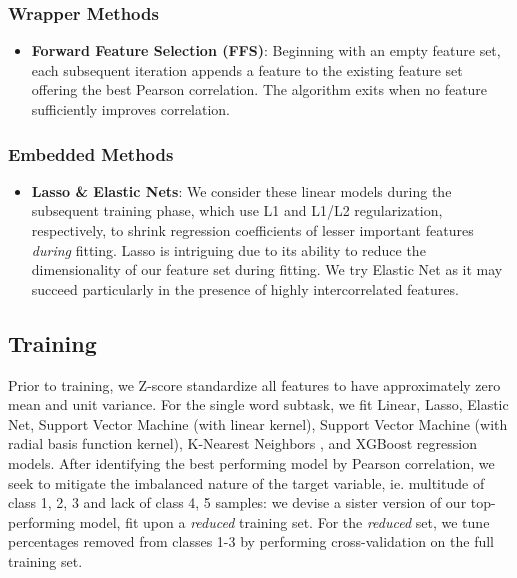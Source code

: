 \documentclass{dcthesis}
\theoremstyle{definition}
\theoremstyle{remark}
\begin{document}
\subsubsection{Wrapper Methods}

\begin{itemize}
  \item \textbf{Forward Feature Selection (FFS)}: Beginning with an empty feature set, each subsequent iteration appends a feature to the existing feature set offering the best Pearson correlation. The algorithm exits when no feature sufficiently improves correlation.
\end{itemize}

\subsubsection{Embedded Methods}
\begin{itemize}
  \item \textbf{Lasso \& Elastic Nets}: We consider these linear models during the subsequent training phase, which use L1 and L1/L2 regularization, respectively, to shrink regression coefficients of lesser important features \textit{during} fitting. Lasso \citep{tibshirani1996regression} is intriguing due to its ability to reduce the dimensionality of our feature set during fitting. We try Elastic Net \citep{zou2005regularization} as it may succeed particularly in the presence of highly intercorrelated features.
\end{itemize}

\subsection{Training}

\label{sec:training}

Prior to training, we Z-score standardize all features to have approximately zero mean and unit variance. For the single word subtask, we fit Linear, Lasso, Elastic Net, Support Vector Machine \citep{platt1999probabilistic} (with linear kernel), Support Vector Machine (with radial basis function kernel), K-Nearest Neighbors \citep{wiki:K-nearest_neighbors_algorithm}, and XGBoost \citep{chen2016xgboost} regression models. After identifying the best performing model by Pearson correlation, we seek to mitigate the imbalanced nature of the target variable, ie. multitude of class 1, 2, 3 and lack of class 4, 5 samples: we devise a sister version of our top-performing model, fit upon a \textit{reduced} training set. For the \textit{reduced} set, we tune percentages removed from classes 1-3 by performing cross-validation on the full  training set.
\end{document}
